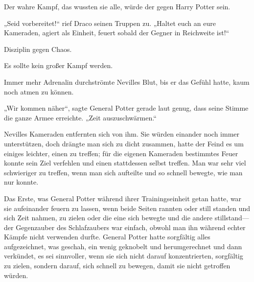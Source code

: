 Der wahre Kampf, das wussten sie alle, würde der gegen Harry Potter sein.

„Seid vorbereitet!“ rief Draco seinen Truppen zu. „Haltet euch an eure Kameraden, agiert als Einheit, feuert sobald der Gegner in Reichweite ist!“

Disziplin gegen Chaos.

Es sollte kein großer Kampf werden.

\later

Immer mehr Adrenalin durchströmte Nevilles Blut, bis er das Gefühl hatte, kaum noch atmen zu können.

„Wir kommen näher“, sagte General Potter gerade laut genug, dass seine Stimme die ganze Armee erreichte. „Zeit auszuschwärmen.“

Nevilles Kameraden entfernten sich von ihm. Sie würden einander noch immer unterstützen, doch drängte man sich zu dicht zusammen, hatte der Feind es um einiges leichter, einen zu treffen; für die eigenen Kameraden bestimmtes Feuer konnte sein Ziel verfehlen und einen stattdessen selbst treffen. Man war sehr viel schwieriger zu treffen, wenn man sich aufteilte und so schnell bewegte, wie man nur konnte.

Das Erste, was General Potter während ihrer Trainingseinheit getan hatte, war sie aufeinander feuern zu lassen, wenn beide Seiten rannten oder still standen und sich Zeit nahmen, zu zielen oder die eine sich bewegte und die andere stillstand—der Gegenzauber des Schlafzaubers war einfach, obwohl man ihn während echter Kämpfe nicht verwenden durfte. General Potter hatte sorgfältig alles aufgezeichnet, was geschah, ein wenig geknobelt und herumgerechnet und dann verkündet, es sei sinnvoller, wenn sie sich nicht darauf konzentrierten, sorgfältig zu zielen, sondern darauf, sich schnell zu bewegen, damit sie nicht getroffen würden.


